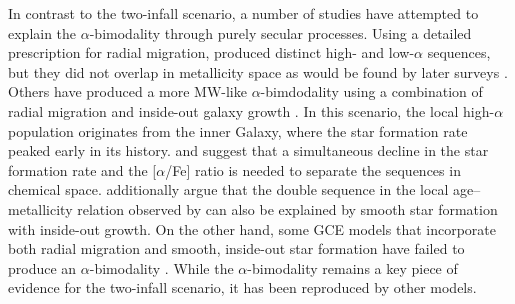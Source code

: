 \documentclass[twocolumn,twocolappendix,linenumbers]{aastex631}
\newcommand{\todo}[1]{{\color{red}#1}}
\newcommand{\aFe}{[$\alpha$/Fe]\xspace}
\begin{document}
In contrast to the two-infall scenario, a number of studies have attempted to explain the $\alpha$-bimodality through purely secular processes. 
Using a detailed prescription for radial migration, \citet{schonrich_chemical_2009} produced distinct high- and low-$\alpha$ sequences, but they did not overlap in metallicity space as would be found by later surveys \citep[e.g.,][]{bensby_exploring_2014}. Others have produced a more MW-like $\alpha$-bimdodality using a combination of radial migration and inside-out galaxy growth \citep[e.g.,][]{kubryk_evolution_2015,sharma_chemical_2021,chen_chemical_2023,prantzos_origin_2023}. In this scenario, the local high-$\alpha$ population originates from the inner Galaxy, where the star formation rate peaked early in its history. \citet{sharma_chemical_2021} and \citet{chen_chemical_2023} suggest that a simultaneous decline in the star formation rate and the \aFe ratio is needed to separate the sequences in chemical space. \citet{chen_recent_2025} additionally argue that the double sequence in the local age--metallicity relation observed by \citet{nissen_high-precision_2020} can also be explained by smooth star formation with inside-out growth. On the other hand, some GCE models that incorporate both radial migration and smooth, inside-out star formation have failed to produce an $\alpha$-bimodality \citep[e.g.,][]{johnson_stellar_2021,dubay_galactic_2024}.
While the $\alpha$-bimodality remains a key piece of evidence for the two-infall scenario, it has been reproduced by other models.
\end{document}
